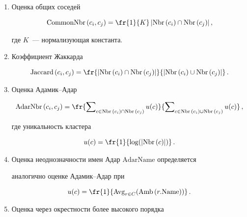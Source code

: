   \begin{enumerate}[1.]


\item Оценка общих соседей


  $$


  \mathrm{CommonNbr}\left(c_i,c_j\right)= \fr{1}{K} \left\vert \mathrm{Nbr}\left(c_i\right) \cap 


\mathrm{Nbr}\left(c_j\right)\right\vert,


$$


   где $K$~--- нормализующая константа. 


  


\item Коэффициент Жаккарда 


  $$


  \mathrm{Jaccard}\,(c_i,c_j) = \fr{\vert \mathrm{Nbr}\,(c_i)\cap \mathrm{Nbr}\,(c_j)\vert}{\vert 


\mathrm{Nbr}\,(c_i)\cup \mathrm{Nbr}\,(c_j)\vert }\,.


  $$


  


\item Оценка Адамик--Адар 


  $$


  \mathrm{AdarNbr}\left(c_i,c_j\right)= \fr{\sum\nolimits_{c\in \mathrm{Nbr}\,(c_i)\cap \mathrm{Nbr}\,(c_j) } 


u(c)}{\sum\nolimits_{c\in \mathrm{Nbr}\,(c_i)\cup \mathrm{Nbr}\,(c_j)} u(c) }\,,


$$


  где уникальность кластера


  $$


  u(c)= \fr{1}{\log ( \vert \mathrm{Nbr}\,(c)\vert )}\,.


  $$


  \item 


Оценка неоднозначности имен Адар $\mathrm{AdarName}$ определяется 


аналогично оценке Ада\-мик--Адар при


  $$


  u(c)=\fr{1}{\mathrm{Avg}_{r\in C}(\mathrm{Amb}\,(r.\mathrm{Name}))}\,.


  $$


  \item 


Оценка через окрестности более высокого порядка



\end{enumerate}
